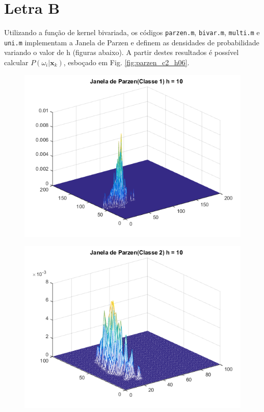 \documentclass[12pt,twoside]{report}
\newcommand{\figureref}[1]{Fig. \ref{fig:#1}}
\newcommand{\code}[1]{\texttt{#1}}
\begin{document}
\section*{Letra B}

Utilizando a função de kernel bivariada, os códigos \code{parzen.m}, \code{bivar.m},
\code{multi.m} e \code{uni.m} implementam a Janela de Parzen e definem as densidades
de probabilidade variando o valor de h (figuras abaixo). A partir destes resultados
é possível calcular $P(\omega_i|\mathbf{x}_k)$, esboçado em \figureref{parzen_c2_h06}.

\begin{figure}[ht]
    \centering
    \includegraphics[scale=0.7]{parzen_c1_h10}
    \caption{}
    \label{fig:parzen_c1_h10}
\end{figure}

\begin{figure}[ht]
    \centering
    \includegraphics[scale=0.7]{parzen_c2_h10}
    \caption{}
    \label{fig:parzen_c2_h10}
\end{figure}
\end{document}
